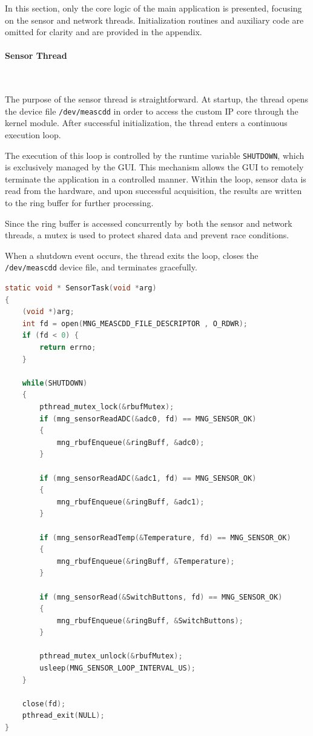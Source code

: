 In this section, only the core logic of the main application is presented, 
focusing on the sensor and network threads. Initialization routines and auxiliary code 
are omitted for clarity and are provided in the appendix.


\paragraph{Sensor Thread}\

The purpose of the sensor thread is straightforward. At startup, the thread opens the 
device file \texttt{/dev/meascdd} in order to access the custom IP core through the 
kernel module. After successful initialization, the thread enters a continuous execution 
loop.

The execution of this loop is controlled by the runtime variable \texttt{SHUTDOWN}, 
which is exclusively managed by the GUI. This mechanism allows the GUI to remotely 
terminate the application in a controlled manner. Within the loop, sensor data is read 
from the hardware, and upon successful acquisition, the results are written to the ring 
buffer for further processing.

Since the ring buffer is accessed concurrently by both the sensor and network threads, 
a mutex is used to protect shared data and prevent race conditions.

When a shutdown event occurs, the thread exits the loop, closes the \texttt{/dev/meascdd} 
device file, and terminates gracefully.
\newpage
\begin{lstlisting}[language=C,
caption={Sensor Thread Implementation},
label={lst:meascdd_read}]
static void * SensorTask(void *arg)
{
    (void *)arg;
    int fd = open(MNG_MEASCDD_FILE_DESCRIPTOR , O_RDWR);
	if (fd < 0) {
		return errno;
	}
    
    while(SHUTDOWN)
    {
        pthread_mutex_lock(&rbufMutex);
        if (mng_sensorReadADC(&adc0, fd) == MNG_SENSOR_OK)
        {           
            mng_rbufEnqueue(&ringBuff, &adc0);
        }

        if (mng_sensorReadADC(&adc1, fd) == MNG_SENSOR_OK)
        {           
            mng_rbufEnqueue(&ringBuff, &adc1);
        }

        if (mng_sensorReadTemp(&Temperature, fd) == MNG_SENSOR_OK)
        {
            mng_rbufEnqueue(&ringBuff, &Temperature);
        }

        if (mng_sensorRead(&SwitchButtons, fd) == MNG_SENSOR_OK)
        {
            mng_rbufEnqueue(&ringBuff, &SwitchButtons);
        }
        
        pthread_mutex_unlock(&rbufMutex);
        usleep(MNG_SENSOR_LOOP_INTERVAL_US);
    }

    close(fd);
    pthread_exit(NULL);
}
\end{lstlisting}



